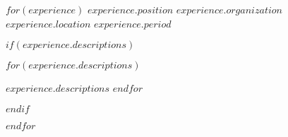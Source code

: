 
\begin{cventries}
  $for(experience)$
    \cventry
      {$experience.position$}
      {$experience.organization$}
      {$experience.location$}
      {$experience.period$}
      {$if(experience.descriptions)$
        \begin{cvitems}
          $for(experience.descriptions)$
            \item {$experience.descriptions$}
          $endfor$
        \end{cvitems}
      $endif$}
      
  $endfor$
\end{cventries}
